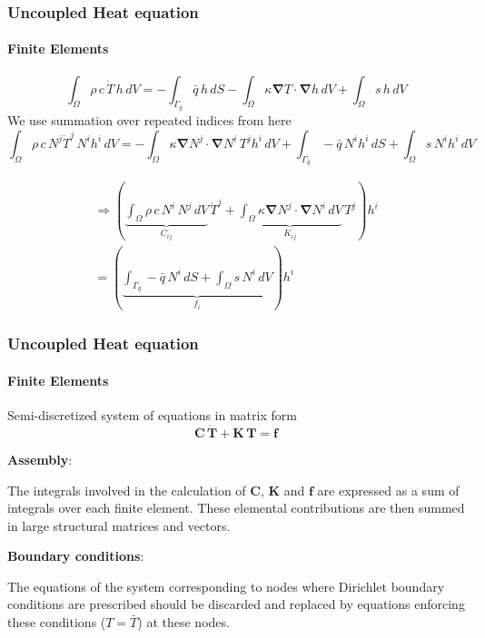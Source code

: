 \documentclass[10pt,xcolor=pdftex,dvipsnames,table]{beamer}
\begin{document}
\begin{frame}
	\frametitle{ Uncoupled Heat equation }
	\framesubtitle{ Finite Elements }
	
	\begin{equation*}
		\int_{\Omega}\rho\,c\,\dot{T}\,h\,dV 
		= - \int_{\Gamma_{\bar{q}}} \bar{q}\, h\, dS
		- \int_{\Omega} \kappa \boldsymbol{\nabla} T \cdot \boldsymbol{\nabla}h \, dV
		+ \int_{\Omega} s\, h\, dV
	\end{equation*}
	We use summation over repeated indices from here
	\begin{equation*}
		\int_{\Omega}\rho\,c\,  N^j \dot{T}^j   \, N^i h^i\,dV 
		= 
		- \int_{\Omega} \kappa \boldsymbol{\nabla} N^j \cdot \boldsymbol{\nabla}N^i\, T^j h^i \, dV + \int_{\Gamma_{\bar{q}}} -\bar{q}\, N^i h^i\, dS
		+ \int_{\Omega} s\, N^i h^i\, dV
	\end{equation*}

	\begin{equation*}
		\begin{aligned}
		\Rightarrow \left(\underbrace{\int_{\Omega}\rho\,c\, N^i\, N^j \,dV}_{C_{ij}}\,  \dot{T}^j 
		+ \underbrace{\int_{\Omega} \kappa \boldsymbol{\nabla} N^j \cdot \boldsymbol{\nabla}N^i \, dV}_{K_{ij}}\, T^j
		\right) h^i \\
		= \left( \underbrace{\int_{\Gamma_{\bar{q}}} -\bar{q}\, N^i\, dS 
		+ \int_{\Omega} s\, N^i\, dV}_{f_i} \right)   h^i
		\end{aligned}
	\end{equation*}

\end{frame}

\begin{frame}
	\frametitle{ Uncoupled Heat equation }
	\framesubtitle{ Finite Elements }

	\begin{block}{Semi-discretized system of equations in matrix form}
		\begin{equation*}
			\mathbf{C}\, \dot{\boldsymbol{T}} + \mathbf{K}\, \boldsymbol{T} = \boldsymbol{f}
		\end{equation*}
	\end{block}


	\textbf{Assembly}:
	
	\bigskip 
	The integrals involved in the calculation of $\mathbf{C}$, $\mathbf{K}$ and $\boldsymbol{f}$ are expressed as a sum of integrals over each finite element. These elemental contributions are then summed in large structural matrices and vectors.

	
	
	\textbf{Boundary conditions}:
	
	\bigskip 
	
	The equations of the system corresponding to nodes where Dirichlet boundary conditions are prescribed should be discarded and replaced by equations enforcing these conditions ($T=\bar{T}$) at these nodes.
	
	
\end{frame}
\end{document}
